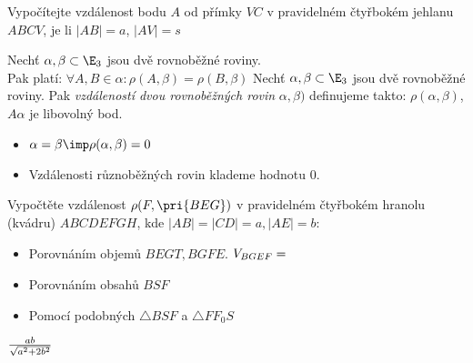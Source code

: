 \Pr Vypočítejte vzdálenost bodu $A$ od přímky $VC$ v pravidelném čtyřbokém jehlanu $ABCV$, je li $|AB|=a$, $|AV|=s$


\V Nechť $\alpha,\beta \subset \E_3$ jsou dvě rovnoběžné roviny.\\
Pak platí: $\forall A,B \in \alpha: \rho(A,\beta) = \rho(B,\beta)$
\Def Nechť $\alpha,\beta \subset \E_3$ jsou dvě rovnoběžné roviny.
Pak \emph{vzdáleností dvou rovnoběžných rovin} $\alpha,\beta)$ definujeme takto: $\rho(\alpha,\beta)$, $A\alpha$ je libovolný bod.
\Pozenum
\begin{itemize}
	\item $\alpha = \beta \imp \rho(\alpha,\beta) = 0 $
	\item Vzdálenosti různoběžných rovin klademe hodnotu 0.
\end{itemize}
\End
\Pr Vypočtěte vzdálenost $\rho(F,\pri{BEG})$ v pravidelném čtyřbokém hranolu (kvádru) $ABCDEFGH$, kde $|AB|=|CD|=a,|AE|=b$:
\begin{itemize}
	\item
		Porovnáním objemů $BEGT,BGFE$.
	$V_{BGEF}=\frac{}{}$
\item Porovnáním obsahů $BSF$
\item Pomocí podobných $\triangle BSF$ a $\triangle FF_0S$
\end{itemize}
$\frac{ab}{\sqrt{a^2+2b^2}}$
\EndDoc


